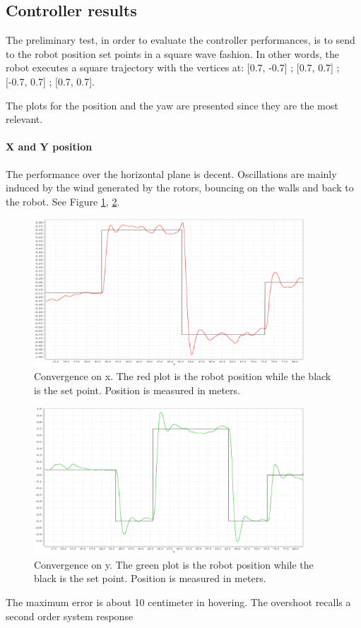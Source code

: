 \subsection{Controller results}

The preliminary test, in order to evaluate the controller performances, is to send to the robot position set points in a square wave fashion. In other words, the robot executes a square trajectory with the vertices at: [0.7, -0.7] ; [0.7, 0.7] ; [-0.7, 0.7] ; [0.7, 0.7].

 The plots for the position and the yaw are presented since they are the most relevant.

\paragraph{X and Y position}  The performance over the horizontal plane is decent. Oscillations are mainly induced by the wind generated by the rotors, bouncing on the walls and back to the robot. See Figure \ref{figure:xconv}, \ref{figure:yconv}.

\begin{figure}[H]
	\centering
	\noindent
	\includegraphics[width=0.9\textwidth]{x_conv.png}
	\caption[Convergence on x]{Convergence on x. The red plot is the robot position while the black is the set point. Position is measured in meters.}
	\label{figure:xconv}
\end{figure}

\begin{figure}[H]
	\centering
	\noindent
	\includegraphics[width=0.9\textwidth]{y_conv.png}
	\caption[Convergence on y]{Convergence on y. The green plot is the robot position while the black is the set point. Position is measured in meters.}
	\label{figure:yconv}
\end{figure}
\noindent
The maximum error is about 10 centimeter in hovering. The overshoot recalls a second order system response \\
